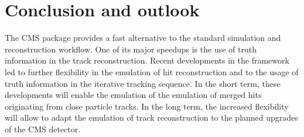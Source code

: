 
\section{Conclusion and outlook}

The CMS \FSIM package provides a fast alternative to the standard simulation and reconstruction workflow. One of its major speedups is the use of truth information in the track reconstruction. Recent developments in the framework led to further flexibility in the emulation of hit reconstruction and to the usage of truth information in the iterative tracking sequence. In the short term, these developments will enable the emulation of the emulation of merged hits originating from close particle tracks. In the long term, the increased flexibility will allow to adapt the emulation of track reconstruction to the planned upgrades of the CMS detector.

